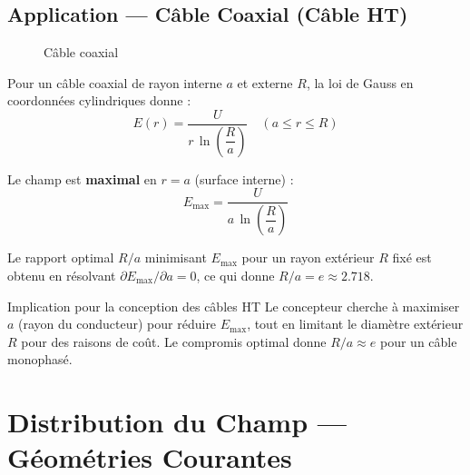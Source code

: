 \documentclass[12pt, a4paper, twoside]{report}
\begin{document}
\subsection{Application — Câble Coaxial (Câble HT)}

\begin{figure}
\vspace{-10pt}
\vspace{-6pt}
\caption{Câble coaxial}
\end{figure}

Pour un câble coaxial de rayon interne $a$ et externe $R$, la loi de Gauss
en coordonnées cylindriques donne :
\begin{equation}
  \boxed{E(r) = \frac{U}{r\,\ln\!\left(\dfrac{R}{a}\right)}}
  \quad (a \leq r \leq R)
\end{equation}

Le champ est \textbf{maximal} en $r = a$ (surface interne) :
\begin{equation}
  E_{\max} = \frac{U}{a\,\ln\!\left(\dfrac{R}{a}\right)}
\end{equation}

Le rapport optimal $R/a$ minimisant $E_{\max}$ pour un rayon extérieur $R$ fixé
est obtenu en résolvant $\partial E_{\max}/\partial a = 0$, ce qui donne $R/a = e \approx 2.718$.

\begin{infobox}{Implication pour la conception des câbles HT}
Le concepteur cherche à maximiser $a$ (rayon du conducteur) pour réduire $E_{\max}$,
tout en limitant le diamètre extérieur $R$ pour des raisons de coût. Le compromis
optimal donne $R/a \approx e$ pour un câble monophasé.
\end{infobox}

\section{Distribution du Champ — Géométries Courantes}
\end{document}
